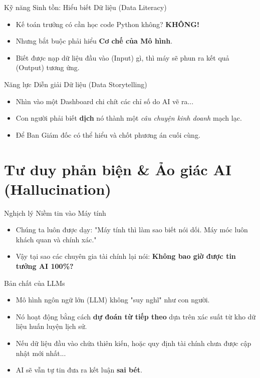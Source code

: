 \documentclass[aspectratio=169,12pt]{beamer}
\begin{document}
\begin{frame}{Kỹ năng Sinh tồn: Hiểu biết Dữ liệu (Data Literacy)}
    \begin{itemize}
        \item Kế toán trưởng có cần học code Python không? \textbf{KHÔNG!}
        \item Nhưng bắt buộc phải hiểu \textbf{Cơ chế của Mô hình}.
        \item Biết được nạp dữ liệu đầu vào (Input) gì, thì máy sẽ phun ra kết quả (Output) tương ứng.
    \end{itemize}
\end{frame}

\begin{frame}{Năng lực Diễn giải Dữ liệu (Data Storytelling)}
    \begin{itemize}
        \item Nhìn vào một Dashboard chi chít các chỉ số do AI vẽ ra...
        \item Con người phải biết \textbf{dịch} nó thành một \textit{câu chuyện kinh doanh} mạch lạc.
        \item Để Ban Giám đốc có thể hiểu và chốt phương án cuối cùng.
    \end{itemize}
\end{frame}


\section{Tư duy phản biện \& Ảo giác AI (Hallucination)}
\begin{frame}
    \tableofcontents[currentsection]
\end{frame}

\begin{frame}{Nghịch lý Niềm tin vào Máy tính}
    \begin{itemize}
        \item Chúng ta luôn được dạy: "Máy tính thì làm sao biết nói dối. Máy móc luôn khách quan và chính xác."
        \item Vậy tại sao các chuyên gia tài chính lại nói: \textbf{Không bao giờ được tin tưởng AI 100\%?}
    \end{itemize}
\end{frame}

\begin{frame}{Bản chất của LLMs}
    \begin{itemize}
        \item Mô hình ngôn ngữ lớn (LLM) không "suy nghĩ" như con người.
        \item Nó hoạt động bằng cách \textbf{dự đoán từ tiếp theo} dựa trên xác suất từ kho dữ liệu huấn luyện lịch sử.
        \item Nếu dữ liệu đầu vào chứa thiên kiến, hoặc quy định tài chính chưa được cập nhật mới nhất... 
        \item AI sẽ vẫn tự tin đưa ra kết luận \textbf{sai bét}.
    \end{itemize}
\end{frame}
\end{document}
